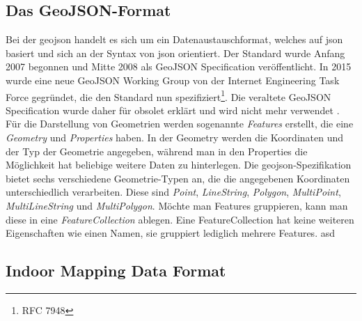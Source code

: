 \subsection{Das GeoJSON-Format}
Bei der \ac{geojson} handelt es sich um ein Datenaustauschformat, welches auf \ac{json} basiert und sich an der Syntax von \ac{json} orientiert. Der Standard wurde Anfang 2007 begonnen und Mitte 2008 als GeoJSON Specification veröffentlicht. In 2015 wurde eine neue GeoJSON Working Group von der Internet Engineering Task Force gegründet, die den Standard nun spezifiziert\footnote{RFC 7948}. Die veraltete GeoJSON Specification wurde daher für obsolet erklärt und wird nicht mehr verwendet \parencite{BUT2008}.\pbreak%
%
Für die Darstellung von Geometrien werden sogenannte \textit{Features} erstellt, die eine \textit{Geometry} und \textit{Properties} haben. In der Geometry werden die Koordinaten und der Typ der Geometrie angegeben, während man in den Properties die Möglichkeit hat beliebige weitere Daten zu hinterlegen. Die \ac{geojson}-Spezifikation bietet sechs verschiedene Geometrie-Typen an, die die angegebenen Koordinaten unterschiedlich verarbeiten. Diese sind \textit{Point}, \textit{LineString}, \textit{Polygon}, \textit{MultiPoint}, \textit{MultiLineString} und \textit{MultiPolygon}.
\pbreak
Möchte man Features gruppieren, kann man diese in eine \textit{FeatureCollection} ablegen. Eine FeatureCollection hat keine weiteren Eigenschaften wie einen Namen, sie gruppiert lediglich mehrere Features.
\pbreak
asd

\subsection{Indoor Mapping Data Format}
